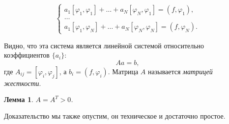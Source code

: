 \documentclass[a4paper, 11pt]{article}
\newtheorem{lemma}{Лемма}
\begin{document}
\begin{equation}
\begin{cases}
a_1[\varphi_1,\varphi_1] + \dots + a_N[\varphi_N,\varphi_1] = (f,\varphi_1),\\
\dots \\
a_1[\varphi_1,\varphi_N] + \dots + a_N[\varphi_N,\varphi_N] = (f,\varphi_N).
\end{cases}
\end{equation}

Видно, что эта система является линейной системой относительно коэффициентов $\{a_i\}$:
\begin{equation}\label{eq:ritz_linsys}
Aa = b,
\end{equation}
где $A_{ij} = [\varphi_i,\varphi_j]$, а $b_i = (f,\varphi_i)$. Матрица $A$ называется \textit{матрицей жесткости}.

\begin{lemma}\label{eq:ritz_a_spd}
	$A = A^T > 0$.
\end{lemma}
Доказательство мы также опустим, он техническое и достаточно простое.
\end{document}
